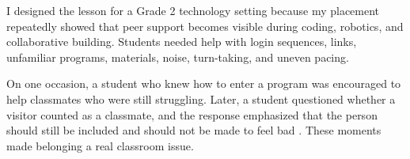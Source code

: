 I designed the lesson for a Grade 2 technology setting because my placement repeatedly showed that peer support becomes visible during coding, robotics, and collaborative building. Students needed help with login sequences, links, unfamiliar programs, materials, noise, turn-taking, and uneven pacing.

On one occasion, a student who knew how to enter a program was encouraged to help classmates who were still struggling. Later, a student questioned whether a visitor counted as a classmate, and the response emphasized that the person should still be included and should not be made to feel bad \citep{placement2026robotics}. These moments made belonging a real classroom issue.

